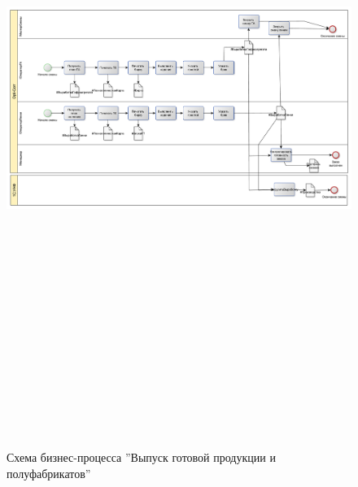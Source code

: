 \begin{figure}[!htb]
\centering
  \includegraphics[width=200mm, height=220mm, angle=90, keepaspectratio]{50_Pics/4 Output.pdf}
\caption{Схема бизнес-процесса ''Выпуск готовой продукции и полуфабрикатов''}
\label{pic:4_Output}
\end{figure} 


